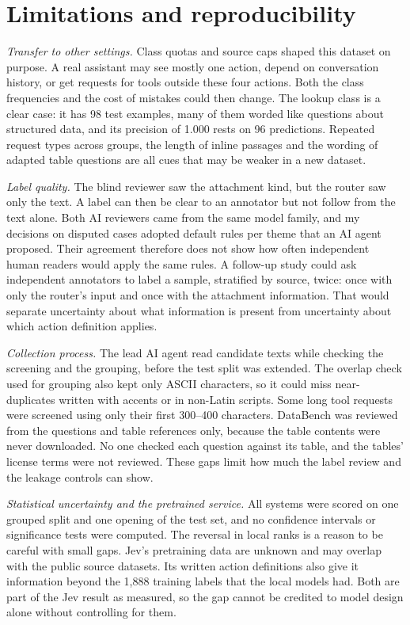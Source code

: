 \documentclass[conference]{IEEEtran}
\begin{document}
\section{Limitations and reproducibility}\label{sec:limits}

\emph{Transfer to other settings.} Class quotas and source caps shaped this dataset on purpose. A real assistant may see mostly one action, depend on conversation history, or get requests for tools outside these four actions. Both the class frequencies and the cost of mistakes could then change. The lookup class is a clear case: it has 98 test examples, many of them worded like questions about structured data, and its precision of 1.000 rests on 96 predictions. Repeated request types across groups, the length of inline passages and the wording of adapted table questions are all cues that may be weaker in a new dataset.

\emph{Label quality.} The blind reviewer saw the attachment kind, but the router saw only the text. A label can then be clear to an annotator but not follow from the text alone. Both AI reviewers came from the same model family, and my decisions on disputed cases adopted default rules per theme that an AI agent proposed. Their agreement therefore does not show how often independent human readers would apply the same rules. A follow-up study could ask independent annotators to label a sample, stratified by source, twice: once with only the router's input and once with the attachment information. That would separate uncertainty about what information is present from uncertainty about which action definition applies.

\emph{Collection process.} The lead AI agent read candidate texts while checking the screening and the grouping, before the test split was extended. The overlap check used for grouping also kept only ASCII characters, so it could miss near-duplicates written with accents or in non-Latin scripts. Some long tool requests were screened using only their first 300--400 characters. DataBench was reviewed from the questions and table references only, because the table contents were never downloaded. No one checked each question against its table, and the tables' license terms were not reviewed. These gaps limit how much the label review and the leakage controls can show.

\emph{Statistical uncertainty and the pretrained service.} All systems were scored on one grouped split and one opening of the test set, and no confidence intervals or significance tests were computed. The reversal in local ranks is a reason to be careful with small gaps. Jev's pretraining data are unknown and may overlap with the public source datasets. Its written action definitions also give it information beyond the 1,888 training labels that the local models had. Both are part of the Jev result as measured, so the gap cannot be credited to model design alone without controlling for them.
\end{document}
